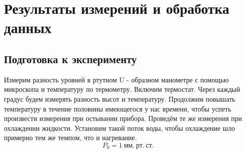 \section{Результаты измерений и обработка данных}

\subsection{Подготовка к эксперименту}
Измерим разность уровней в ртутном U - образном манометре с помощью микроскопа и температуру по термометру. Включим термостат. Через каждый градус будем измерять разность высот и температуру. Продолжим повышать температуру в течение половины имеющегося у нас времени, чтобы успеть произвести измерения при остывании прибора. Проведём те же измерения при охлаждении жидкости. Установим такой поток воды, чтобы охлаждение шло примерно тем же темпом, что и нагревание.
\\
\begin{equation*}
P_0 = 1 \ мм. \ рт.\ ст. 
\end{equation*}
\newpage
